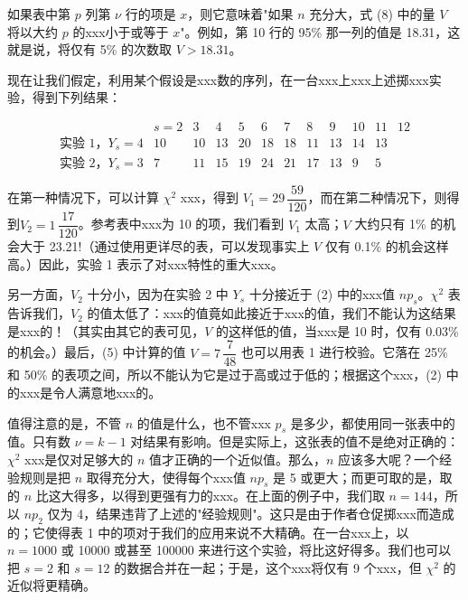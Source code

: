 如果表中第 $p$ 列第 $\nu$ 行的项是 $x$，则它意味着"如果 $n$ 充分大，式 (8) 中的量 $V$ 将以大约 $p$ 的xxx小于或等于 $x$"。例如，第 10 行的 95\% 那一列的值是 18.31，这就是说，将仅有 5\% 的次数取 $V > 18.31$。

现在让我们假定，利用某个假设是xxx数的序列，在一台xxx上xxx上述掷xxx实验，得到下列结果：

\begin{equation}
\begin{array}{lcccccccccc}
 & s=2 & 3 & 4 & 5 & 6 & 7 & 8 & 9 & 10 & 11 & 12 \\
\text{实验 1，} Y_s = 4 & 10 & 10 & 13 & 20 & 18 & 18 & 11 & 13 & 14 & 13 \\
\text{实验 2，} Y_s = 3 & 7 & 11 & 15 & 19 & 24 & 21 & 17 & 13 & 9 & 5
\end{array} \tag{9}
\end{equation}

在第一种情况下，可以计算 $\chi^2$ xxx，得到 $V_1 = 29\,\dfrac{59}{120}$，而在第二种情况下，则得到$V_2 = 1\,\dfrac{17}{120}$。参考表中xxx为 10 的项，我们看到 $V_1$ 太高；$V$ 大约只有 1\% 的机会大于 23.21!（通过使用更详尽的表，可以发现事实上 $V$ 仅有 0.1\% 的机会这样高。）因此，实验 1 表示了对xxx特性的重大xxx。

另一方面，$V_2$ 十分小，因为在实验 2 中 $Y_s$ 十分接近于 (2) 中的xxx值 $np_s$。$\chi^2$ 表告诉我们，$V_2$ 的值太低了：xxx的值竟如此接近于xxx的值，我们不能认为这结果是xxx的！（其实由其它的表可见，$V$ 的这样低的值，当xxx是 10 时，仅有 0.03\% 的机会。）最后，(5) 中计算的值 $V = 7\,\dfrac{7}{48}$ 也可以用表 1 进行校验。它落在 25\% 和 50\% 的表项之间，所以不能认为它是过于高或过于低的；根据这个xxx，(2) 中的xxx是令人满意地xxx的。

值得注意的是，不管 $n$ 的值是什么，也不管xxx $p_s$ 是多少，都使用同一张表中的值。只有数 $\nu = k - 1$ 对结果有影响。但是实际上，这张表的值不是绝对正确的：$\chi^2$ xxx是仅对足够大的 $n$ 值才正确的一个近似值。那么，$n$ 应该多大呢？一个经验规则是把 $n$ 取得充分大，使得每个xxx值 $np_s$ 是 5 或更大；而更可取的是，取的 $n$ 比这大得多，以得到更强有力的xxx。在上面的例子中，我们取 $n = 144$，所以 $np_2$ 仅为 4，结果违背了上述的"经验规则"。这只是由于作者仓促掷xxx而造成的；它使得表 1 中的项对于我们的应用来说不大精确。在一台xxx上，以 $n = 1000$ 或 10000 或甚至 100000 来进行这个实验，将比这好得多。我们也可以把 $s = 2$ 和 $s = 12$ 的数据合并在一起；于是，这个xxx将仅有 9 个xxx，但 $\chi^2$ 的近似将更精确。

